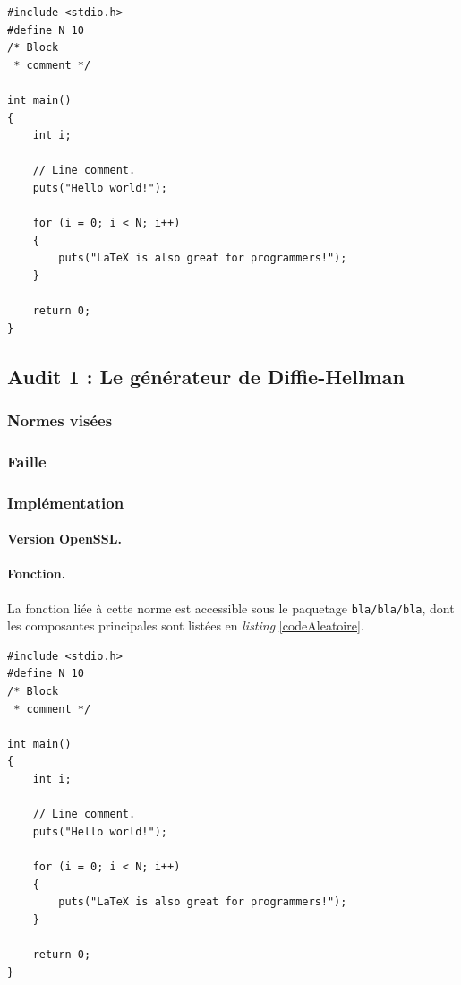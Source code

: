 		
		\begin{lstlisting}[style=customc,caption=codeAleatoire.c, label=codeAleatoire]
#include <stdio.h>
#define N 10
/* Block
 * comment */
 
int main()
{
    int i;
 
    // Line comment.
    puts("Hello world!");
 
    for (i = 0; i < N; i++)
    {
        puts("LaTeX is also great for programmers!");
    }
 
    return 0;
}
		\end{lstlisting}
		

	
		
	\subsection{Audit 1 : Le générateur de Diffie-Hellman}
		\subsubsection{Normes visées}

	
		\subsubsection{Faille}
	
	
	
		\subsubsection{Implémentation}
		
			\paragraph{Version OpenSSL.\\}
		
			\paragraph{Fonction.\\}
		La fonction liée à cette norme est accessible sous le paquetage \texttt{bla/bla/bla}, dont les composantes principales sont listées en \textit{listing} \ref{codeAleatoire}.
		
		
		\begin{lstlisting}[style=customc,caption=codeAleatoire.c, label=codeAleatoire]
#include <stdio.h>
#define N 10
/* Block
 * comment */
 
int main()
{
    int i;
 
    // Line comment.
    puts("Hello world!");
 
    for (i = 0; i < N; i++)
    {
        puts("LaTeX is also great for programmers!");
    }
 
    return 0;
}
		\end{lstlisting}
		
